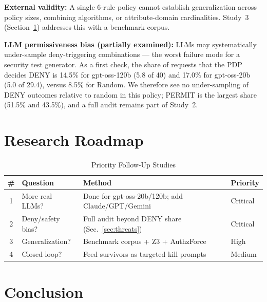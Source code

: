 \documentclass[conference]{IEEEtran}
\begin{document}
\textbf{External validity:} A single 6-rule policy cannot establish
generalization across policy sizes, combining algorithms, or attribute-domain
cardinalities. Study~3 (Section~\ref{sec:roadmap}) addresses this with a
benchmark corpus.

\textbf{LLM permissiveness bias (partially examined):} LLMs may
systematically under-sample deny-triggering combinations --- the worst failure
mode for a security test generator. As a first check, the share of requests that the PDP decides DENY is 14.5\%
for gpt-oss-120b (5.8 of 40) and 17.0\% for gpt-oss-20b (5.0 of 29.4), versus
8.5\% for Random. We therefore see no under-sampling of DENY outcomes relative
to random in this policy; PERMIT is the largest share (51.5\% and 43.5\%), and a
full audit remains part of Study~2.

\section{Research Roadmap}
\label{sec:roadmap}

\begin{table}[htbp]
\caption{Priority Follow-Up Studies}
\label{tab:roadmap}
\begin{center}
\begin{tabular}{|c|p{2.0cm}|p{2.3cm}|p{1.0cm}|}
\hline
\textbf{\#} & \textbf{Question} & \textbf{Method} & \textbf{Priority} \\
\hline
1 & More real LLMs? & Done for gpt-oss-20b/120b; add Claude/GPT/Gemini & Critical \\
\hline
2 & Deny/safety bias? & Full audit beyond DENY share (Sec.~\ref{sec:threats}) & Critical \\
\hline
3 & Generalization? & Benchmark corpus + Z3 + AuthzForce & High \\
\hline
4 & Closed-loop? & Feed survivors as targeted kill prompts & Medium \\
\hline
\end{tabular}
\end{center}
\end{table}

\section{Conclusion}
\end{document}
